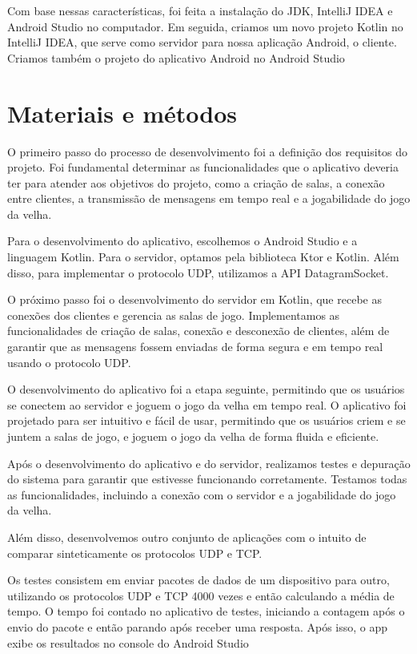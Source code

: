 \documentclass[12pt]{article}
\begin{document}
Com base nessas características, foi feita a instalação do JDK, IntelliJ IDEA e Android Studio no computador. Em seguida, criamos um novo projeto Kotlin no IntelliJ IDEA, que serve como servidor para nossa aplicação Android, o cliente. Criamos também o projeto do aplicativo Android no Android Studio

\section{Materiais e métodos}
O primeiro passo do processo de desenvolvimento foi a definição dos requisitos do projeto. Foi fundamental determinar as funcionalidades que o aplicativo deveria ter para atender aos objetivos do projeto, como a criação de salas, a conexão entre clientes, a transmissão de mensagens em tempo real e a jogabilidade do jogo da velha.

Para o desenvolvimento do aplicativo, escolhemos o Android Studio e a linguagem Kotlin. Para o servidor, optamos pela biblioteca Ktor e Kotlin. Além disso, para implementar o protocolo UDP, utilizamos a API DatagramSocket.

O próximo passo foi o desenvolvimento do servidor em Kotlin, que recebe as conexões dos clientes e gerencia as salas de jogo. Implementamos as funcionalidades de criação de salas, conexão e desconexão de clientes, além de garantir que as mensagens fossem enviadas de forma segura e em tempo real usando o protocolo UDP.

O desenvolvimento do aplicativo foi a etapa seguinte, permitindo que os usuários se conectem ao servidor e joguem o jogo da velha em tempo real. O aplicativo foi projetado para ser intuitivo e fácil de usar, permitindo que os usuários criem e se juntem a salas de jogo, e joguem o jogo da velha de forma fluida e eficiente.

Após o desenvolvimento do aplicativo e do servidor, realizamos testes e depuração do sistema para garantir que estivesse funcionando corretamente. Testamos todas as funcionalidades, incluindo a conexão com o servidor e a jogabilidade do jogo da velha.

Além disso, desenvolvemos outro conjunto de aplicações com o intuito de comparar sinteticamente os protocolos UDP e TCP.

Os testes consistem em enviar pacotes de dados de um dispositivo para outro, utilizando os protocolos UDP e TCP 4000 vezes e então calculando a média de tempo. O tempo foi contado no aplicativo de testes, iniciando a contagem após o envio do pacote e então parando após receber uma resposta. 
Após isso, o app exibe os resultados no console do Android Studio
\end{document}
